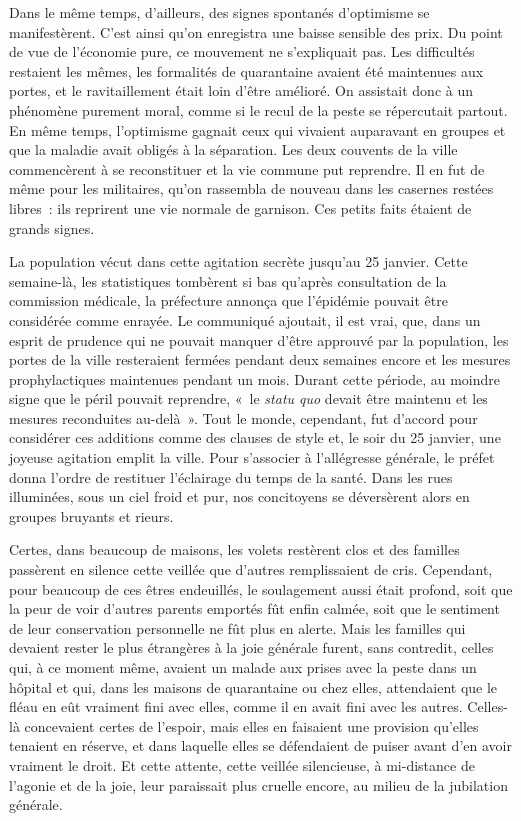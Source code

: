 \documentclass[french,twoside]{book} %
\begin{document}
Dans le même temps, d’ailleurs, des signes spontanés d’optimisme se manifestèrent. C’est ainsi qu’on enregistra une baisse sensible des prix. Du point de vue de l’économie pure, ce mouvement ne s’expliquait pas. Les difficultés restaient les mêmes, les formalités de quarantaine avaient été maintenues aux portes, et le ravitaillement était loin d’être amélioré. On assistait donc à un phénomène purement moral, comme si le recul de la peste se répercutait partout. En même temps, l’optimisme gagnait ceux qui vivaient auparavant en groupes et que la maladie avait obligés à la séparation. Les deux couvents de la ville commencèrent à se reconstituer et la vie commune put reprendre. Il en fut de même pour les militaires, qu’on rassembla de nouveau dans les casernes restées libres : ils reprirent une vie normale de garnison. Ces petits faits étaient de grands signes.\par
La population vécut dans cette agitation secrète jusqu’au 25 janvier. Cette semaine-là, les statistiques tombèrent si bas qu’après consultation de la commission médicale, la préfecture annonça que l’épidémie pouvait être considérée comme enrayée. Le communiqué ajoutait, il est vrai, que, dans un esprit de prudence qui ne pouvait manquer d’être approuvé par la population, les portes de la ville resteraient fermées pendant deux semaines encore et les mesures prophylactiques maintenues pendant un mois. Durant cette période, au moindre signe que le péril pouvait reprendre, « le \emph{statu quo} devait être maintenu et les mesures reconduites au-delà ». Tout le monde, cependant, fut d’accord pour considérer ces additions comme des clauses de style et, le soir du 25 janvier, une joyeuse agitation emplit la ville. Pour s’associer à l’allégresse générale, le préfet donna l’ordre de restituer l’éclairage du temps de la santé. Dans les rues illuminées, sous un ciel froid et pur, nos concitoyens se déversèrent alors en groupes bruyants et rieurs.\par
Certes, dans beaucoup de maisons, les volets restèrent clos et des familles passèrent en silence cette veillée que d’autres remplissaient de cris. Cependant, pour beaucoup de ces êtres endeuillés, le soulagement aussi était profond, soit que la peur de voir d’autres parents emportés fût enfin calmée, soit que le sentiment de leur conservation personnelle ne fût plus en alerte. Mais les familles qui devaient rester le plus étrangères à la joie générale furent, sans contredit, celles qui, à ce moment même, avaient un malade aux prises avec la peste dans un hôpital et qui, dans les maisons de quarantaine ou chez elles, attendaient que le fléau en eût vraiment fini avec elles, comme il en avait fini avec les autres. Celles-là concevaient certes de l’espoir, mais elles en faisaient une provision qu’elles tenaient en réserve, et dans laquelle elles se défendaient de puiser avant d’en avoir vraiment le droit. Et cette attente, cette veillée silencieuse, à mi-distance de l’agonie et de la joie, leur paraissait plus cruelle encore, au milieu de la jubilation générale.\par
\end{document}
